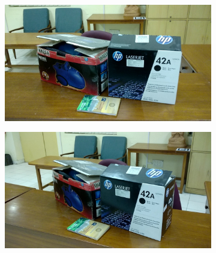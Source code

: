 \documentclass{article}
\begin{document}
\begin{enumerate}
\begin{figure}[H]
\begin{subfigure}{.33\textwidth}
					  	\caption{}\label{fig:sub1}
					\end{subfigure}%
					\begin{subfigure}{.33\textwidth}
					  	\centering
					  	\includegraphics[width=1.0\linewidth]{1_4_image.jpg}
					  	\caption{}\label{fig:sub2}
					\end{subfigure}
					\begin{subfigure}{.33\textwidth}
					  	\centering
					  	\includegraphics[width=1.0\linewidth]{1_5_image.jpg}
					  	\caption{}\label{fig:sub2}
					\end{subfigure}
					

\end{figure}
\end{enumerate}
\end{document}
